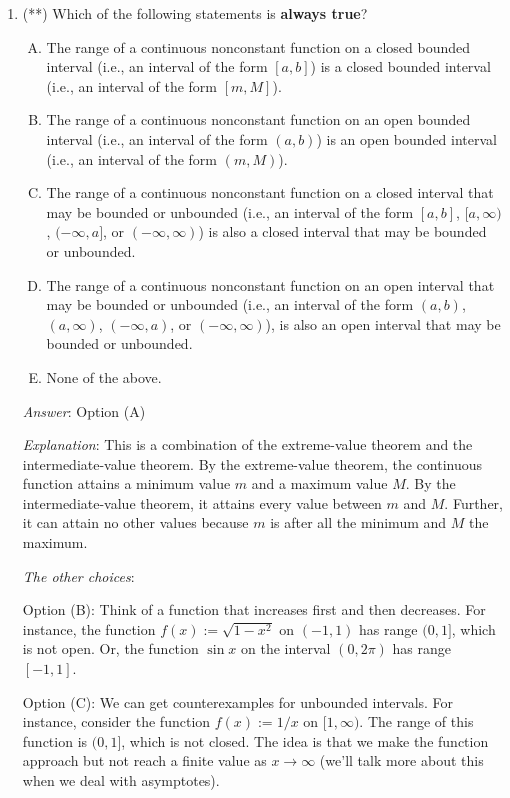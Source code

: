 \documentclass[10pt]{amsart}
\begin{document}
\begin{enumerate}

\item (**) Which of the following statements is {\bf always true}?

  \begin{enumerate}[(A)]

  \item The range of a continuous nonconstant function on a closed
    bounded interval (i.e., an interval of the form $[a,b]$) is a
    closed bounded interval (i.e., an interval of the form $[m,M]$).
  \item The range of a continuous nonconstant function on an open
    bounded interval (i.e., an interval of the form $(a,b)$) is an
    open bounded interval (i.e., an interval of the form $(m,M)$).
  \item The range of a continuous nonconstant function on a closed
    interval that may be bounded or unbounded (i.e., an interval of
    the form $[a,b]$, $[a,\infty)$, $(-\infty,a]$, or
    $(-\infty,\infty)$) is also a closed interval that may be bounded
    or unbounded.
  \item The range of a continuous nonconstant function on an open
    interval that may be bounded or unbounded (i.e., an interval of
    the form $(a,b)$,$(a,\infty)$, $(-\infty,a)$, or
    $(-\infty,\infty)$), is also an open interval that may be bounded
    or unbounded.
  \item None of the above.
  \end{enumerate}

  {\em Answer}: Option (A)

  {\em Explanation}: This is a combination of the extreme-value
  theorem and the intermediate-value theorem. By the extreme-value
  theorem, the continuous function attains a minimum value $m$ and a
  maximum value $M$. By the intermediate-value theorem, it attains
  every value between $m$ and $M$. Further, it can attain no other
  values because $m$ is after all the minimum and $M$ the maximum.

  {\em The other choices}:

  Option (B): Think of a function that increases first and then
  decreases. For instance, the function $f(x) := \sqrt{1 - x^2}$ on
  $(-1,1)$ has range $(0,1]$, which is not open. Or, the function
  $\sin x$ on the interval $(0,2\pi)$ has range $[-1,1]$.

  Option (C): We can get counterexamples for unbounded intervals. For
  instance, consider the function $f(x) := 1/x$ on $[1,\infty)$. The
  range of this function is $(0,1]$, which is not closed. The idea is
  that we make the function approach but not reach a finite value as
  $x \to \infty$ (we'll talk more about this when we deal with
  asymptotes).


\end{enumerate}
\end{document}
